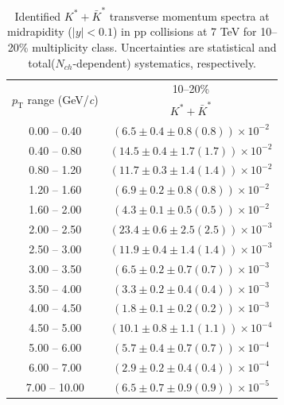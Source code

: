 \begin{table}
\caption{Identified $K^{*} + \bar{K}^{*}$ transverse momentum spectra at midrapidity ($|y|<0.1$) in pp collisions at 7 TeV for 10--20\% multiplicity class. Uncertainties are statistical and total($N_{ch}$-dependent) systematics, respectively.}
\label{tab:KStar_10to20}
\begin{center}
\begin{tabular}{ c | c }
\hline
\multirow{2}{*}{$p_{\mathrm{T}}$ range (GeV/\textit{c})} & \multicolumn{1}{c}{10--20\%} \\ & $K^{*} + \bar{K}^{*}$\\ 
\hline
0.00 -- 0.40 & $(6.5\pm0.4\pm0.8(0.8))\times10^{-2}$ \\ 
0.40 -- 0.80 & $(14.5\pm0.4\pm1.7(1.7))\times10^{-2}$ \\ 
0.80 -- 1.20 & $(11.7\pm0.3\pm1.4(1.4))\times10^{-2}$ \\ 
1.20 -- 1.60 & $(6.9\pm0.2\pm0.8(0.8))\times10^{-2}$ \\ 
1.60 -- 2.00 & $(4.3\pm0.1\pm0.5(0.5))\times10^{-2}$ \\ 
2.00 -- 2.50 & $(23.4\pm0.6\pm2.5(2.5))\times10^{-3}$ \\ 
2.50 -- 3.00 & $(11.9\pm0.4\pm1.4(1.4))\times10^{-3}$ \\ 
3.00 -- 3.50 & $(6.5\pm0.2\pm0.7(0.7))\times10^{-3}$ \\ 
3.50 -- 4.00 & $(3.3\pm0.2\pm0.4(0.4))\times10^{-3}$ \\ 
4.00 -- 4.50 & $(1.8\pm0.1\pm0.2(0.2))\times10^{-3}$ \\ 
4.50 -- 5.00 & $(10.1\pm0.8\pm1.1(1.1))\times10^{-4}$ \\ 
5.00 -- 6.00 & $(5.7\pm0.4\pm0.7(0.7))\times10^{-4}$ \\ 
6.00 -- 7.00 & $(2.9\pm0.2\pm0.4(0.4))\times10^{-4}$ \\ 
7.00 -- 10.00 & $(6.5\pm0.7\pm0.9(0.9))\times10^{-5}$ \\ 
\hline
\end{tabular}
\end{center}
\end{table}
 

